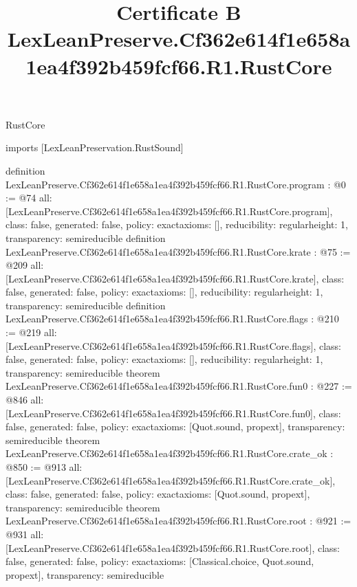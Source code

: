 \begin{lexlean}{RustCore}
\title{Certificate B LexLeanPreserve.Cf362e614f1e658a1ea4f392b459fcf66.R1.RustCore}
\begin{coremodule}
imports [LexLeanPreservation.RustSound]

definition LexLeanPreserve.Cf362e614f1e658a1ea4f392b459fcf66.R1.RustCore.program : @0 := @74 {
  all: [LexLeanPreserve.Cf362e614f1e658a1ea4f392b459fcf66.R1.RustCore.program],
  class: false,
  generated: false,
  policy: exact{axioms: []},
  reducibility: regular{height: 1},
  transparency: semireducible
}
definition LexLeanPreserve.Cf362e614f1e658a1ea4f392b459fcf66.R1.RustCore.krate : @75 := @209 {
  all: [LexLeanPreserve.Cf362e614f1e658a1ea4f392b459fcf66.R1.RustCore.krate],
  class: false,
  generated: false,
  policy: exact{axioms: []},
  reducibility: regular{height: 1},
  transparency: semireducible
}
definition LexLeanPreserve.Cf362e614f1e658a1ea4f392b459fcf66.R1.RustCore.flags : @210 := @219 {
  all: [LexLeanPreserve.Cf362e614f1e658a1ea4f392b459fcf66.R1.RustCore.flags],
  class: false,
  generated: false,
  policy: exact{axioms: []},
  reducibility: regular{height: 1},
  transparency: semireducible
}
theorem LexLeanPreserve.Cf362e614f1e658a1ea4f392b459fcf66.R1.RustCore.fun0 : @227 := @846 {
  all: [LexLeanPreserve.Cf362e614f1e658a1ea4f392b459fcf66.R1.RustCore.fun0],
  class: false,
  generated: false,
  policy: exact{axioms: [Quot.sound, propext]},
  transparency: semireducible
}
theorem LexLeanPreserve.Cf362e614f1e658a1ea4f392b459fcf66.R1.RustCore.crate_ok : @850 := @913 {
  all: [LexLeanPreserve.Cf362e614f1e658a1ea4f392b459fcf66.R1.RustCore.crate_ok],
  class: false,
  generated: false,
  policy: exact{axioms: [Quot.sound, propext]},
  transparency: semireducible
}
theorem LexLeanPreserve.Cf362e614f1e658a1ea4f392b459fcf66.R1.RustCore.root : @921 := @931 {
  all: [LexLeanPreserve.Cf362e614f1e658a1ea4f392b459fcf66.R1.RustCore.root],
  class: false,
  generated: false,
  policy: exact{axioms: [Classical.choice, Quot.sound, propext]},
  transparency: semireducible
}


\end{coremodule}
\end{lexlean}
